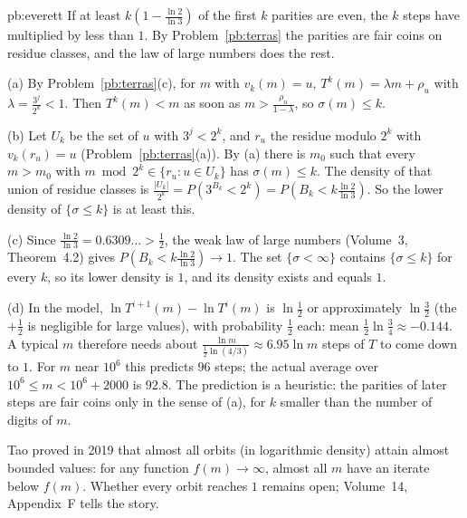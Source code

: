 \begin{solution}{pb:everett}
\idea If at least $k(1-\frac{\ln2}{\ln3})$ of the first $k$ parities are even, the $k$ steps have multiplied by less than $1$. By Problem~\ref{pb:terras} the parities are fair
coins on residue classes, and the law of large numbers does the rest.

\writeup (a) By Problem~\ref{pb:terras}(c), for $m$ with $v_k(m)=u$, $T^k(m)=\lambda m+\rho_u$ with $\lambda=\frac{3^j}{2^k}<1$. Then $T^k(m)<m$ as soon as $m>\frac{\rho_u}{1-\lambda}$, so $\sigma(m)\le k$.

(b) Let $U_k$ be the set of $u$ with $3^j<2^k$, and $r_u$ the residue modulo $2^k$ with $v_k(r_u)=u$ (Problem~\ref{pb:terras}(a)). By (a) there is $m_0$ such that every $m>m_0$ with
$m\bmod2^k\in\{r_u:u\in U_k\}$ has $\sigma(m)\le k$. The density of that union of residue classes is $\frac{|U_k|}{2^k}=P(3^{B_k}<2^k)=P(B_k<k\frac{\ln2}{\ln3})$. So the lower density of
$\{\sigma\le k\}$ is at least this.

(c) Since $\frac{\ln2}{\ln3}=0.6309\ldots>\frac12$, the weak law of large numbers (Volume~3, Theorem~4.2) gives $P(B_k<k\frac{\ln2}{\ln3})\to1$. The set $\{\sigma<\infty\}$ contains $\{\sigma\le k\}$
for every $k$, so its lower density is $1$, and its density exists and equals $1$.

(d) In the model, $\ln T^{i+1}(m)-\ln T^i(m)$ is $\ln\frac12$ or approximately $\ln\frac32$ (the $+\frac12$ is negligible for large values), with probability $\frac12$ each:
mean $\frac12\ln\frac34\approx-0.144$. A typical $m$ therefore needs about $\frac{\ln m}{\frac12\ln(4/3)}\approx6.95\ln m$ steps of $T$ to come down to $1$. For $m$ near $10^6$ this
predicts $96$ steps; the actual average over $10^6\le m<10^6+2000$ is $92.8$. The prediction is a heuristic: the parities of later steps are
fair coins only in the sense of (a), for $k$ smaller than the number of digits of $m$.

\leads Tao proved in 2019 that almost all orbits (in logarithmic density) attain almost bounded values: for any function $f(m)\to\infty$, almost all $m$
have an iterate below $f(m)$. Whether every orbit reaches $1$ remains open; Volume~14, Appendix~F tells the story.
\end{solution}

